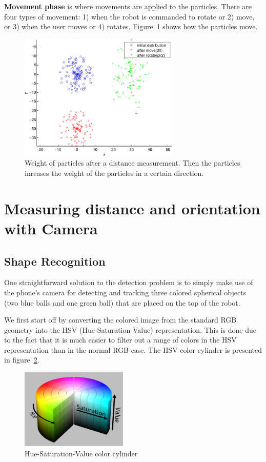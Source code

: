 \documentclass[journal]{IEEEtran}
\let\MYoriglatexcaption\caption
\renewcommand{\caption}[2][\relax]{\MYoriglatexcaption[#2]{#2}}
\begin{document}
\textbf{Movement phase} is where movements are applied to the particles. There
are four types of movement: 1) when the robot is commanded to rotate or 2) move,
or 3) when the user moves or 4) rotates. Figure~\ref{fig:particle-move} shows
how the particles move.

\begin{figure}[!htpb]
 \centering
 \includegraphics[width=3in]{images/particle-move.pdf}
 \caption{Weight of particles after a distance measurement. Then the particles
inreases the weight of the particles in a certain direction.}
 \label{fig:particle-move}
\end{figure}


\section{Measuring distance and orientation with Camera}

\subsection{Shape Recognition}

One straightforward solution to the detection problem is to simply make use of
the phone's camera for detecting and tracking three colored spherical objects
(two blue balls and one green ball) that are placed on the top of the robot.

We first start off by converting the colored image from the standard RGB geometry into the HSV (Hue-Saturation-Value) representation. This is done due to the fact that it is much easier to filter out a range of colors in the HSV representation than in the normal RGB case. The HSV color cylinder is presented in figure~\ref{fig:sim}.

\begin{figure}[!htpb]
\centering
\includegraphics[width=2in]{images/hsv_representation}
\caption{Hue-Saturation-Value color cylinder}
\label{fig:sim}
\end{figure}
\end{document}
